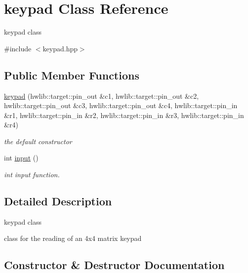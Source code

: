 \hypertarget{classkeypad}{}\section{keypad Class Reference}
\label{classkeypad}


keypad class  




{\ttfamily \#include $<$keypad.\+hpp$>$}

\subsection*{Public Member Functions}
\begin{DoxyCompactItemize}
\item 
\hyperlink{classkeypad_a6e342bf7c51143f25a84db9e0992039b}{keypad} (hwlib\+::target\+::pin\+\_\+out \&c1, hwlib\+::target\+::pin\+\_\+out \&c2, hwlib\+::target\+::pin\+\_\+out \&c3, hwlib\+::target\+::pin\+\_\+out \&c4, hwlib\+::target\+::pin\+\_\+in \&r1, hwlib\+::target\+::pin\+\_\+in \&r2, hwlib\+::target\+::pin\+\_\+in \&r3, hwlib\+::target\+::pin\+\_\+in \&r4)
\begin{DoxyCompactList}\small\item\em the default constructor \end{DoxyCompactList}\item 
int \hyperlink{classkeypad_a2a1334d93f32abfe59930a35b61bdbba}{input} ()
\begin{DoxyCompactList}\small\item\em int input function. \end{DoxyCompactList}\end{DoxyCompactItemize}


\subsection{Detailed Description}
keypad class 

class for the reading of an 4x4 matrix keypad 

\subsection{Constructor \& Destructor Documentation}
